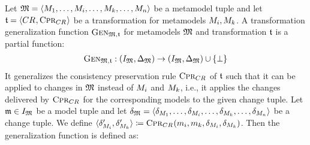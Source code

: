 \begin{definition}
    \label{def:generalizationfunction}
    Let $\metamodeltuple{M} = \tupled{\metamodel{M}{1}, \dots, \metamodel{M}{i}, \dots, \metamodel{M}{k}, \dots, \metamodel{M}{n}}$ be a metamodel tuple and let $\transformation{t} = \tupled{\consistencyrelation{CR}{}, \consistencypreservationrule{\consistencyrelation{CR}{}}}$ be a transformation for metamodels $\metamodel{M}{i}, \metamodel{M}{k}$.
    A transformation generalization function $\generalizationfunction{\metamodeltuple{M},\transformation{t}}$ for metamodels $\metamodeltuple{M}$ and transformation $\transformation{t}$ is a partial function:
    \begin{align*}
        \generalizationfunction{\metamodeltuple{M},\transformation{t}} : (\metamodeltupleinstanceset{M}, \changeuniverse{\metamodeltuple{M}}) \rightarrow (\metamodeltupleinstanceset{M}, \changeuniverse{\metamodeltuple{M}}) \cup \setted{\bot}
    \end{align*}
    It generalizes the consistency preservation rule $\consistencypreservationrule{\consistencyrelation{CR}{}}$ of $\transformation{t}$ such that it can be applied to changes in $\metamodeltuple{M}$ instead of $\metamodel{M}{i}$ and $\metamodel{M}{k}$, i.e., it applies the changes delivered by $\consistencypreservationrule{\consistencyrelation{CR}{}}$ for the corresponding models to the given change tuple.
    Let $\modeltuple{m} \in \metamodeltupleinstanceset{M}$ be a model tuple and let $\changetuple{\metamodeltuple{M}} = \tupled{\change{\metamodel{M}{1}}, \dots, \change{\metamodel{M}{i}}, \dots, \change{\metamodel{M}{k}}, \dots, \change{\metamodel{M}{n}}}$ be a change tuple.
    We define $\tupled{\change{\metamodel{M}{i}}', \change{\metamodel{M}{k}}'} \equalsperdefinition \consistencypreservationrule{\consistencyrelation{CR}{}}(\model{m}{i}, \model{m}{k}, \change{\metamodel{M}{i}}, \change{\metamodel{M}{k}})$.
    Then the generalization function is defined as:
    \newcommand{\localequation}[1]{
        \begin{align*}
            &
            \generalizationfunction{\metamodeltuple{M},\transformation{t}}(\modeltuple{m}, \changetuple{\metamodeltuple{M}})

\end{align*}}
\end{definition}
